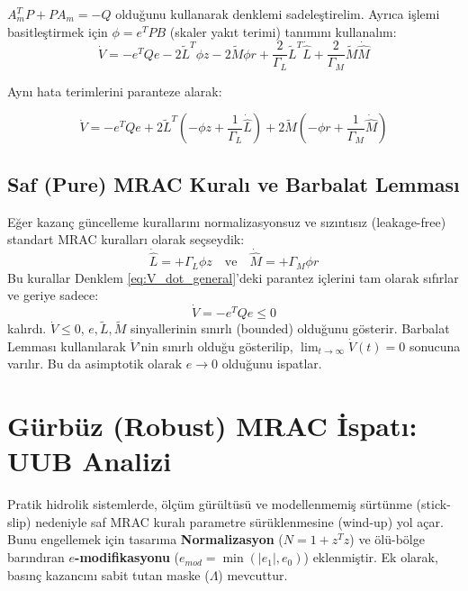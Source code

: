 \documentclass[12pt,a4paper]{article}
\begin{document}
$A_m^T P + P A_m = -Q$ olduğunu kullanarak denklemi sadeleştirelim. Ayrıca işlemi basitleştirmek için $\phi = e^T P B$ (skaler yakıt terimi) tanımını kullanalım:
\begin{equation}
    \dot{V} = -e^T Q e - 2 \tilde{L}^T \phi z - 2 \tilde{M} \phi r + \frac{2}{\Gamma_L} \tilde{L}^T \dot{\hat{L}} + \frac{2}{\Gamma_M} \tilde{M} \dot{\hat{M}}
\end{equation}

Aynı hata terimlerini paranteze alarak:
\begin{mdframed}[backgroundcolor=gray!10, linecolor=black, roundcorner=5pt]
\begin{equation}
    \dot{V} = -e^T Q e + 2 \tilde{L}^T \left( - \phi z + \frac{1}{\Gamma_L} \dot{\hat{L}} \right) + 2 \tilde{M} \left( - \phi r + \frac{1}{\Gamma_M} \dot{\hat{M}} \right)
    \label{eq:V_dot_general}
\end{equation}
\end{mdframed}

\subsection{Saf (Pure) MRAC Kuralı ve Barbalat Lemması}
Eğer kazanç güncelleme kurallarını normalizasyonsuz ve sızıntısız (leakage-free) standart MRAC kuralları olarak seçseydik:
\begin{equation}
    \dot{\hat{L}} = +\Gamma_L \phi z \quad \text{ve} \quad \dot{\hat{M}} = +\Gamma_M \phi r
\end{equation}
Bu kurallar Denklem \ref{eq:V_dot_general}'deki parantez içlerini tam olarak sıfırlar ve geriye sadece:
\begin{equation}
    \dot{V} = -e^T Q e \leq 0
\end{equation}
kalırdı. $\dot{V} \le 0$, $e, \tilde{L}, \tilde{M}$ sinyallerinin sınırlı (bounded) olduğunu gösterir. Barbalat Lemması kullanılarak $\ddot{V}$'nin sınırlı olduğu gösterilip, $\lim_{t \to \infty} \dot{V}(t) = 0$ sonucuna varılır. Bu da asimptotik olarak $e \to 0$ olduğunu ispatlar.

\section{Gürbüz (Robust) MRAC İspatı: UUB Analizi}

Pratik hidrolik sistemlerde, ölçüm gürültüsü ve modellenmemiş sürtünme (stick-slip) nedeniyle saf MRAC kuralı parametre sürüklenmesine (wind-up) yol açar. Bunu engellemek için tasarıma \textbf{Normalizasyon} ($N = 1+z^T z$) ve ölü-bölge barındıran \textbf{$e$-modifikasyonu} ($e_{mod} = \min(|e_1|, e_0)$) eklenmiştir. Ek olarak, basınç kazancını sabit tutan maske ($\Lambda$) mevcuttur. 
\end{document}
